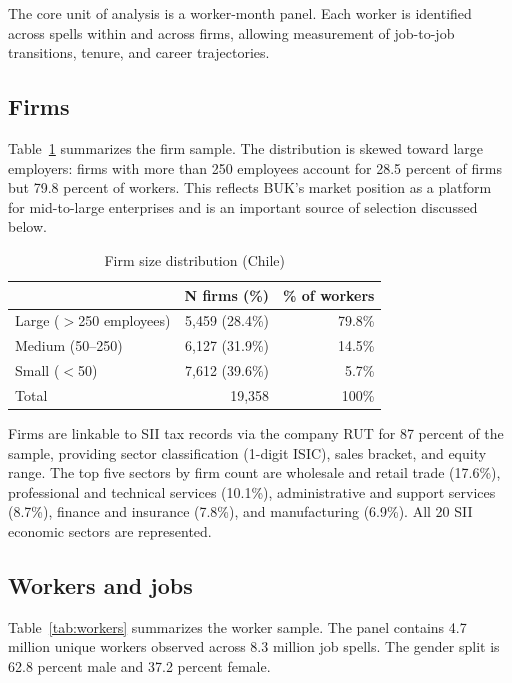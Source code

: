 \documentclass[11pt]{article}
\begin{document}
The core unit of analysis is a worker-month panel. Each worker is identified across spells within and across firms, allowing measurement of job-to-job transitions, tenure, and career trajectories.

\subsection{Firms}

Table~\ref{tab:firms} summarizes the firm sample. The distribution is skewed toward large employers: firms with more than 250 employees account for 28.5 percent of firms but 79.8 percent of workers. This reflects BUK's market position as a platform for mid-to-large enterprises and is an important source of selection discussed below.

\begin{table}[h]
\centering
\caption{Firm size distribution (Chile)}
\label{tab:firms}
\begin{tabular}{lrr}
\hline
 & N firms (\%) & \% of workers \\
\hline
Large ($>$250 employees) & 5,459 (28.4\%) & 79.8\% \\
Medium (50--250)         & 6,127 (31.9\%) & 14.5\% \\
Small ($<$50)            & 7,612 (39.6\%) &  5.7\% \\
\hline
Total                    & 19,358         & 100\%  \\
\hline
\end{tabular}
\end{table}

Firms are linkable to SII tax records via the company RUT for 87 percent of the sample, providing sector classification (1-digit ISIC), sales bracket, and equity range. The top five sectors by firm count are wholesale and retail trade (17.6\%), professional and technical services (10.1\%), administrative and support services (8.7\%), finance and insurance (7.8\%), and manufacturing (6.9\%). All 20 SII economic sectors are represented.

\subsection{Workers and jobs}

Table~\ref{tab:workers} summarizes the worker sample. The panel contains 4.7 million unique workers observed across 8.3 million job spells. The gender split is 62.8 percent male and 37.2 percent female.
\end{document}

